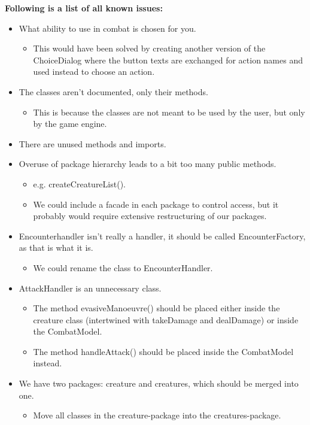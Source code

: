 \textbf{Following is a list of all known issues:}
\begin{itemize}[$\circ$]
	\item What ability to use in combat is chosen for you.
\begin{itemize}[$-$]
	\item This would have been solved by creating another version of the ChoiceDialog where the button texts are exchanged for action names and used instead to choose an action.
\end{itemize}
\item The classes aren't documented, only their methods.
\begin{itemize}[$-$]
	\item This is because the classes are not meant to be used by the user, but only by the game engine.
\end{itemize}
\item There are unused methods and imports.
\item Overuse of package hierarchy leads to a bit too many public methods.
\begin{itemize}[$-$]
	\item e.g. createCreatureList().
	\item We could include a facade in each package to control access, but it probably would require extensive restructuring of our packages.
\end{itemize}
\item Encounterhandler isn't really a handler, it should be called EncounterFactory, as that is what it is.
\begin{itemize}[$-$]
	\item We could rename the class to EncounterHandler.
\end{itemize}
\item AttackHandler is an unnecessary class.
\begin{itemize}[$-$]
	\item The method evasiveManoeuvre() should be placed either inside the creature class (intertwined with takeDamage and dealDamage) or inside the CombatModel.
	\item The method handleAttack() should be placed inside the CombatModel instead.
\end{itemize}
\item We have two packages: creature and creatures, which should be merged into one.
\begin{itemize}[$-$]
	\item Move all classes in the creature-package into the creatures-package.

\end{itemize}
\end{itemize}
